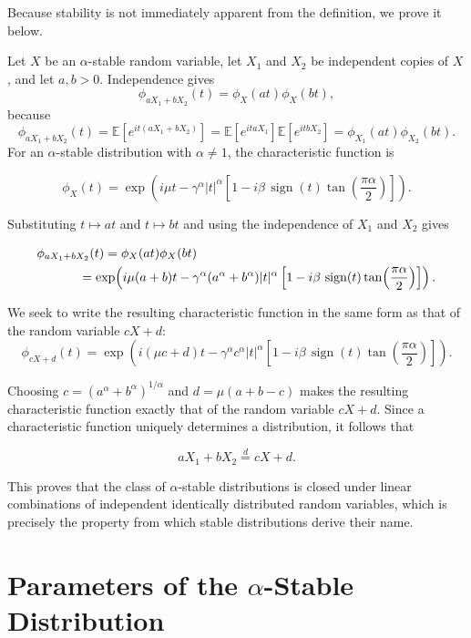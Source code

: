 \documentclass[a4paper, 12pt, openany]{book}
\begin{document}
Because stability is not immediately apparent from the definition, we prove it below.
\begin{tcolorbox}[colback=red!5!white,colframe=red!50!black,title=Proof 1: Stability of an $\alpha$-stable distribution]
Let $X$ be an $\alpha$-stable random variable, let $X_1$ and $X_2$ be independent copies of $X$, and let $a,b>0$. Independence gives
\[
\phi_{aX_1+bX_2}(t)
=
\phi_X(at)\phi_X(bt),
\]
because
\[
\phi_{aX_1+bX_2}(t)
= \mathbb{E}\!\left[e^{it(aX_1+bX_2)}\right]
= \mathbb{E}\!\left[e^{itaX_1}\right]
  \mathbb{E}\!\left[e^{itbX_2}\right]
= \phi_{X_1}(at)\phi_{X_2}(bt).
\]
For an $\alpha$-stable distribution with $\alpha\neq1$, the characteristic function is

\[
\phi_X(t)
=
\exp\!\left(
i\mu t
-\gamma^\alpha |t|^\alpha
\left[
1-i\beta\,\operatorname{sign}(t)\tan\!\left(\frac{\pi\alpha}{2}\right)
\right]
\right).
\]

Substituting $t\mapsto at$ and $t\mapsto bt$ and using the independence of $X_1$ and $X_2$ gives

\[
\begin{aligned}
\phi_{aX_1+bX_2}(t)
&=
\phi_X(at)\phi_X(bt) \\
&\hspace{-2em}=
\exp\!\left(
i\mu(a+b)t
-
\gamma^\alpha(a^\alpha+b^\alpha)|t|^\alpha
\left[
1-i\beta\,\operatorname{sign}(t)\tan\!\left(\frac{\pi\alpha}{2}\right)
\right]
\right).
\end{aligned}
\]


We seek to write the resulting characteristic function in the same form as that of the random variable $cX+d$:
\[
\phi_{cX + d}(t)=
\exp\!\left(
i(\mu c + d)t 
-
\gamma^\alpha c^\alpha|t|^\alpha
\left[
1-i\beta\,\operatorname{sign}(t)\tan\!\left(\frac{\pi\alpha}{2}\right)
\right]
\right).
\]

Choosing $c=\left(a^\alpha+b^\alpha\right)^{1/\alpha}$ and $d=\mu(a+b-c)$ makes the resulting characteristic function exactly that of the random variable $cX+d$. Since a characteristic function uniquely determines a distribution, it follows that

\[
aX_1+bX_2 \overset{d}{=} cX+d.
\]
\end{tcolorbox}
This proves that the class of $\alpha$-stable distributions is closed under linear combinations of independent identically distributed random variables, which is precisely the property from which stable distributions derive their name.

\section{Parameters of the $\alpha$-Stable Distribution}
\end{document}
